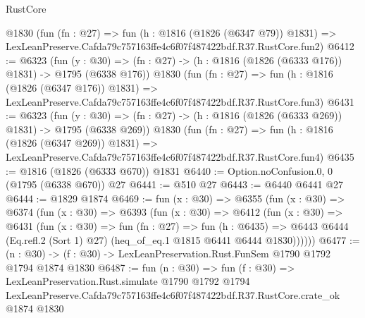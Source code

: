 \begin{lexlean}{RustCore}
\begin{coremodule}
    @1830
    (fun (fn : @27) =>
    fun (h : @1816 (@1826 (@6347 @79)) @1831) =>
    LexLeanPreserve.Cafda79c757163ffe4c6f07f487422bdf.R37.RustCore.fun2)
@6412 := @6323
    (fun (y : @30) => (fn : @27) -> (h : @1816 (@1826 (@6333 @176)) @1831) -> @1795 (@6338 @176))
    @1830
    (fun (fn : @27) =>
    fun (h : @1816 (@1826 (@6347 @176)) @1831) =>
    LexLeanPreserve.Cafda79c757163ffe4c6f07f487422bdf.R37.RustCore.fun3)
@6431 := @6323
    (fun (y : @30) => (fn : @27) -> (h : @1816 (@1826 (@6333 @269)) @1831) -> @1795 (@6338 @269))
    @1830
    (fun (fn : @27) =>
    fun (h : @1816 (@1826 (@6347 @269)) @1831) =>
    LexLeanPreserve.Cafda79c757163ffe4c6f07f487422bdf.R37.RustCore.fun4)
@6435 := @1816 (@1826 (@6333 @670)) @1831
@6440 := Option.noConfusion.{0, 0} (@1795 (@6338 @670)) @27
@6441 := @510 @27
@6443 := @6440 @6441 @27
@6444 := @1829 @1874
@6469 := fun (x : @30) =>
  @6355
    (fun (x : @30) =>
    @6374
      (fun (x : @30) =>
      @6393
        (fun (x : @30) =>
        @6412
          (fun (x : @30) =>
          @6431
            (fun (x : @30) =>
            fun (fn : @27) =>
            fun (h : @6435) =>
            @6443 @6444 (Eq.refl.{2} (Sort 1) @27) (heq_of_eq.{1} @1815 @6441 @6444 @1830))))))
@6477 := (n : @30) -> (f : @30) -> LexLeanPreservation.Rust.FunSem @1790 @1792 @1794 @1874 @1830
@6487 := fun (n : @30) =>
  fun (f : @30) =>
  LexLeanPreservation.Rust.simulate
    @1790
    @1792
    @1794
    LexLeanPreserve.Cafda79c757163ffe4c6f07f487422bdf.R37.RustCore.crate_ok
    @1874
    @1830
\end{coremodule}
\end{lexlean}
